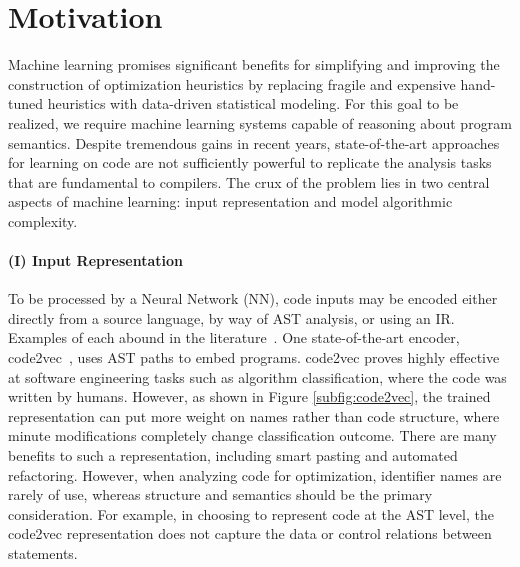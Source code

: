 \section{Motivation}

Machine learning promises significant benefits for simplifying and
improving the construction of optimization heuristics by replacing
fragile and expensive hand-tuned heuristics with data-driven
statistical modeling. For this goal to be realized, we require machine
learning systems capable of reasoning about program semantics. Despite
tremendous gains in recent years, state-of-the-art approaches for
learning on code are not sufficiently powerful to replicate the
analysis tasks that are fundamental to compilers. The crux of the
problem lies in two central aspects of machine learning: input
representation and model algorithmic complexity.

\paragraph{(I) Input Representation}

To be processed by a Neural Network (NN), code inputs may be encoded
either directly from a source language, by way of AST analysis, or
using an IR. Examples of each abound in the
literature~\cite{Allamanis2017a,Chen2019,Wang2018}. One
state-of-the-art encoder, code2vec~\cite{Alon2018a}, uses AST paths to
embed programs. code2vec proves highly effective at software
engineering tasks such as algorithm classification, where the code was
written by humans. However, as shown in Figure \ref{subfig:code2vec},
the trained representation can put more weight on names rather than
code structure, where minute modifications completely change
classification outcome. There are many benefits to such a
representation, including smart pasting and automated
refactoring. However, when analyzing code for optimization, identifier
names are rarely of use, whereas structure and semantics should be the
primary consideration. For example, in choosing to represent code at
the AST level, the code2vec representation does not capture the data
or control relations between statements.

